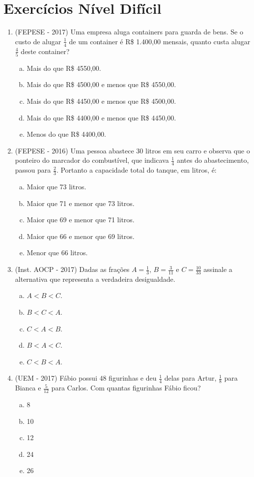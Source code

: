 \section{Exercícios Nível Difícil}
 \begin{enumerate}
  \item (FEPESE - 2017) Uma empresa aluga containers para guarda de bens. Se o custo de alugar $\frac{1}{4}$ de um container é R\$ 1.400,00 mensais, quanto custa alugar $\frac{4}{5}$ deste container?
  \begin{enumerate}[a)]
  \item Mais do que R\$ 4550,00. 
  \item Mais do que R\$ 4500,00 e menos que R\$ 4550,00. 
  \item Mais do que R\$ 4450,00 e menos que R\$ 4500,00. 
  \item Mais do que R\$ 4400,00 e menos que R\$ 4450,00. 
  \item Menos do que R\$ 4400,00. 
  \end{enumerate}
  
  \item (FEPESE - 2016) Uma pessoa abastece 30 litros em seu carro e observa que o ponteiro do marcador do combustível, que indicava $\frac{1}{4}$ antes do abastecimento, passou para $\frac{2}{3}$. Portanto a capacidade total do tanque, em litros, é:
  \begin{enumerate}[a)]
  \item Maior que 73 litros.
  \item Maior que 71 e menor que 73 litros.
  \item Maior que 69 e menor que 71 litros.
  \item Maior que 66 e menor que 69 litros.
  \item Menor que 66 litros.
  \end{enumerate}
  
  \item (Inst. AOCP - 2017) Dadas as frações $A= \frac{1}{3}$, $B= \frac{3}{11}$ e $C= \frac{10}{33}$ assinale a alternativa que representa a verdadeira desigualdade.
  \begin{enumerate}[a)]
  \item $A < B < C$.
  \item $B < C < A$.
  \item $C < A < B$.
  \item $B < A < C$.
  \item $C < B < A$.
  \end{enumerate}
  
  \item (UEM - 2017) Fábio possui $48$ figurinhas e deu $\frac{1}{4}$ delas para Artur, $\frac{1}{8}$ para Bianca e $\frac{5}{12}$ para Carlos. Com quantas figurinhas Fábio ficou?
  \begin{enumerate}[a)]
  \item 8
  \item 10
  \item 12
  \item 24
  \item 26
  \end{enumerate}
  
\end{enumerate}
  
